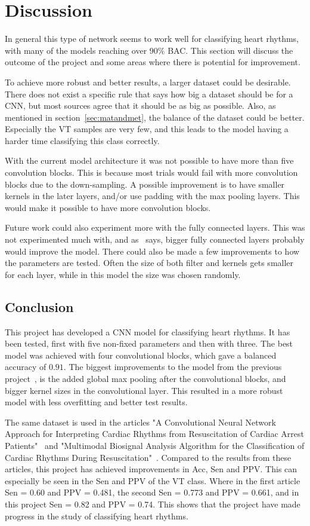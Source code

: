 \section{Discussion}

In general this type of network seems to work well for classifying heart rhythms, with many of the models reaching over $90\%$ BAC. This section will discuss the outcome of the project and some areas where there is potential for improvement.


%
To achieve more robust and better results, a larger dataset could be desirable. There does not exist a specific rule that says how big a dataset should be for a CNN, but most sources agree that it should be as big as possible. Also, as mentioned in section~\ref{sec:matandmet}, the balance of the dataset could be better. Especially the VT samples are very few, and this leads to the model having a harder time classifying this class correctly. 

With the current model architecture it was not possible to have more than five convolution blocks. This is because most trials would fail with more convolution blocks due to the down-sampling. A possible improvement is to have smaller kernels in the later layers, and/or use padding with the max pooling layers. This would make it possible to have more convolution blocks.

Future work could also experiment more with the fully connected layers. This was not experimented much with, and as~\cite{fullyconnected} says, bigger fully connected layers probably would improve the model. There could also be made a few improvements to how the parameters are tested. Often the size of both filter and kernels gets smaller for each layer, while in this model the size was chosen randomly. 

\subsection{Conclusion}

This project has developed a CNN model for classifying heart rhythms. It has been tested, first with five non-fixed parameters and then with three. The best model was achieved with four convolutional blocks, which gave a balanced accuracy of $0.91$. The biggest improvements to the model from the previous project~\cite{cardiac}, is the added global max pooling after the convolutional blocks, and bigger kernel sizes in the convolutional layer. This resulted in a more robust model with less overfitting and better test results. 

The same dataset is used in the articles "A Convolutional Neural Network Approach for Interpreting Cardiac Rhythms from Resuscitation of Cardiac Arrest Patients"~\cite{eftes} and "Multimodal Biosignal Analysis Algorithm for the  Classification of Cardiac Rhythms During Resuscitation"~\cite{lasa}. Compared to the results from these articles, this project has achieved improvements in Acc, Sen and PPV. This can especially be seen in the Sen and PPV of the VT class. Where in the first article Sen = 0.60 and PPV = 0.481, the second Sen = 0.773 and PPV = 0.661, and in this project Sen = 0.82 and PPV = 0.74. This shows that the project have made progress in the study of classifying heart rhythms.  
 
